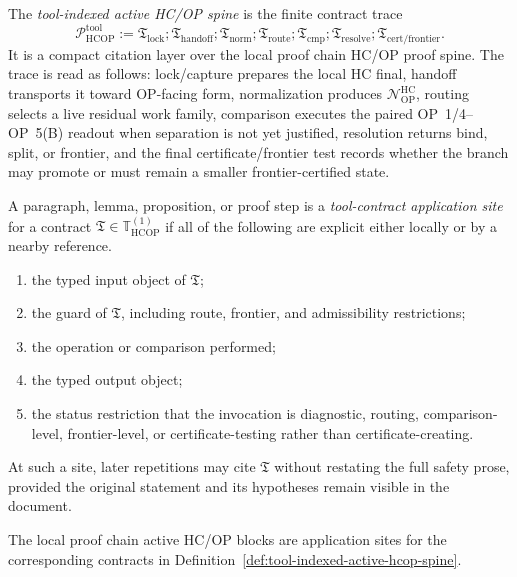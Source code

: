 \begin{definition}
\label{def:tool-indexed-active-hcop-spine}
The \emph{tool-indexed active HC/OP spine} is the finite contract trace
\[
 \mathcal P_{\mathrm{HCOP}}^{\mathrm{tool}}
 :=
 \mathfrak T_{\mathrm{lock}}
 ;\mathfrak T_{\mathrm{handoff}}
 ;\mathfrak T_{\mathrm{norm}}
 ;\mathfrak T_{\mathrm{route}}
 ;\mathfrak T_{\mathrm{cmp}}
 ;\mathfrak T_{\mathrm{resolve}}
 ;\mathfrak T_{\mathrm{cert/frontier}} .
\]
It is a compact citation layer over the local proof chain HC/OP proof spine. The trace is read as follows: lock/capture prepares the local HC final, handoff transports it toward OP-facing form, normalization produces \(\mathcal N_{\mathrm{OP}}^{\mathrm{HC}}\), routing selects a live residual work family, comparison executes the paired OP~1/4--OP~5(B) readout when separation is not yet justified, resolution returns bind, split, or frontier, and the final certificate/frontier test records whether the branch may promote or must remain a smaller frontier-certified state.
\end{definition}

\begin{definition}
\label{def:tool-contract-application-site}
A paragraph, lemma, proposition, or proof step is a \emph{tool-contract application site} for a contract \(\mathfrak T\in\mathbb T_{\mathrm{HCOP}}^{(1)}\) if all of the following are explicit either locally or by a nearby reference.
\begin{enumerate}[leftmargin=2em,label=(\roman*)]
 \item the typed input object of \(\mathfrak T\);
 \item the guard of \(\mathfrak T\), including route, frontier, and admissibility restrictions;
 \item the operation or comparison performed;
 \item the typed output object;
 \item the status restriction that the invocation is diagnostic, routing, comparison-level, frontier-level, or certificate-testing rather than certificate-creating.
\end{enumerate}
At such a site, later repetitions may cite \(\mathfrak T\) without restating the full safety prose, provided the original statement and its hypotheses remain visible in the document.
\end{definition}

\begin{lemma}
\label{lem:active-hcop-blocks-are-contract-application-sites}
The local proof chain active HC/OP blocks are application sites for the corresponding contracts in Definition~\ref{def:tool-indexed-active-hcop-spine}.
\end{lemma}

